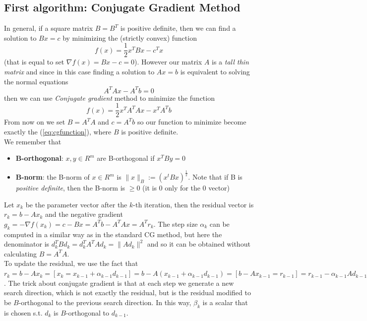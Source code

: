 \documentclass{article}
\begin{document}
\subsection{First algorithm: Conjugate Gradient Method}\label{subsec:conjugate-gradient-method}
In general, if a square matrix $B = B^{T}$ is positive definite, then we can find a solution to $Bx = c$ by minimizing the (strictly convex) function 
\begin{equation}\label{eq:cgfunction}
f(x) = \frac{1}{2}x^{T}Bx - c^{T}x  
\end{equation}
(that is equal to set $\nabla f(x) = Bx - c = 0$). However our matrix $A$ is a \emph{tall thin matrix} and since in this case finding a solution to  $Ax = b$ is equivalent to solving the normal equations
\[
A^{T}Ax - A^{T}b = 0
\]
then we can use \textit{Conjugate gradient} method to minimize the function
\[
f(x) = \frac{1}{2}x^{T}A^{T}Ax - x^{T}A^{T}b
\]
From now on we set $B = A^{T}A$ and $c = A^{T}b$ so our function to minimize become exactly the (\ref{eq:cgfunction}), where $B$ is positive definite. 
\\We remember that \begin{itemize}
\item \textbf{B-orthogonal}: $x, y \in R^{m}$ are B-orthogonal if $x^{T}By = 0$
\item \textbf{B-norm}: the B-norm of $x \in R^{m}$ is $\|x\|_{B} := (x^{t}Bx)^{\frac{1}{2}}$. Note that if B is \textit{positive definite}, then the B-norm is $\geq 0$ (it is $0$ only for the $0$ vector)
\end{itemize}
Let $x_{k}$ be the parameter vector after the $k$-th iteration, then the residual vector is $r_{k} = b - Ax_{k}$ and the negative gradient $g_{k} = -\nabla f(x_{k}) = c - Bx = A^{T}b - A^{T}Ax = A^{T}r_{k}$. The step size $\alpha_{k}$ can be computed in a similar way as in the standard CG method, but here the denominator is $d_{k}^{T}Bd_k= d_{k}^{T}A^{T}Ad_k = \|Ad_{k}\|^2$ and so it can be obtained without calculating $B = A^{T}A$.
\\To update the residual, we use the fact that $r_{k} = b - Ax_{k} = [x_{k} = x_{k-1} + \alpha_{k-1}d_{k-1}] = b - A(x_{k-1} + \alpha_{k-1}d_{k-1}) = [b-Ax_{k-1} = r_{k-1}] = r_{k-1} - \alpha_{k-1}Ad_{k-1}$. The trick about conjugate gradient is that at each step we generate a new search direction, which is not exactly the residual, but is the residual modified to be $B$-orthogonal to the previous search direction. In this way, $\beta_{k}$ is a scalar that is chosen s.t. $d_{k}$ is $B$-orthogonal to $d_{k-1}$.
\end{document}

